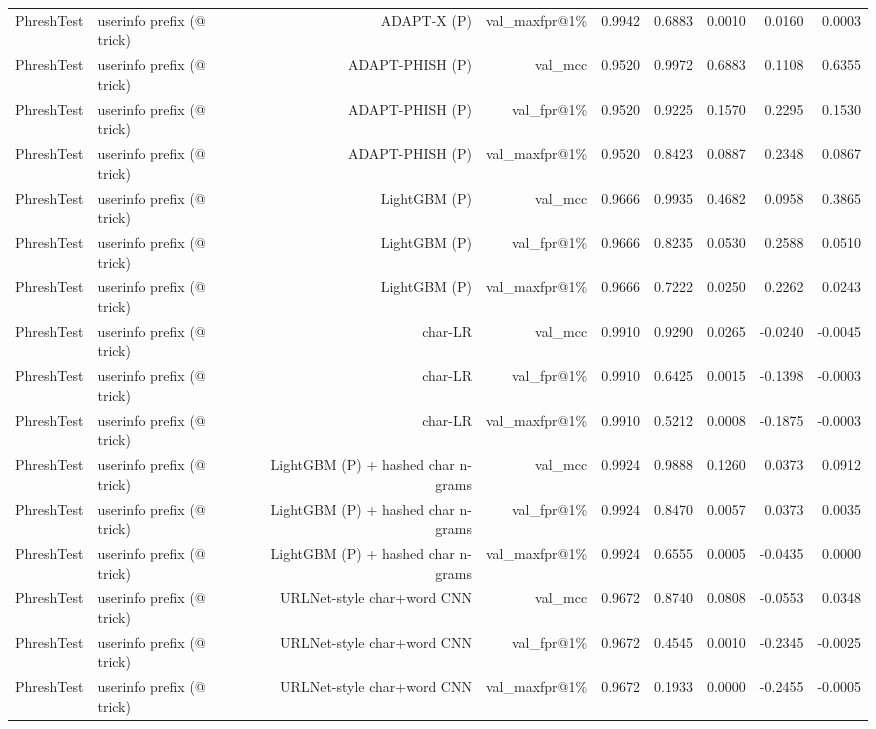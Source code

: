 \begin{table}[t]
\begin{tabular}{llrrrrrrr}
PhreshTest & userinfo prefix (@ trick) & ADAPT-X (P) & val\_maxfpr@1\% & 0.9942 & 0.6883 & 0.0010 & 0.0160 & 0.0003 \\
PhreshTest & userinfo prefix (@ trick) & ADAPT-PHISH (P) & val\_mcc & 0.9520 & 0.9972 & 0.6883 & 0.1108 & 0.6355 \\
PhreshTest & userinfo prefix (@ trick) & ADAPT-PHISH (P) & val\_fpr@1\% & 0.9520 & 0.9225 & 0.1570 & 0.2295 & 0.1530 \\
PhreshTest & userinfo prefix (@ trick) & ADAPT-PHISH (P) & val\_maxfpr@1\% & 0.9520 & 0.8423 & 0.0887 & 0.2348 & 0.0867 \\
PhreshTest & userinfo prefix (@ trick) & LightGBM (P) & val\_mcc & 0.9666 & 0.9935 & 0.4682 & 0.0958 & 0.3865 \\
PhreshTest & userinfo prefix (@ trick) & LightGBM (P) & val\_fpr@1\% & 0.9666 & 0.8235 & 0.0530 & 0.2588 & 0.0510 \\
PhreshTest & userinfo prefix (@ trick) & LightGBM (P) & val\_maxfpr@1\% & 0.9666 & 0.7222 & 0.0250 & 0.2262 & 0.0243 \\
PhreshTest & userinfo prefix (@ trick) & char-LR & val\_mcc & 0.9910 & 0.9290 & 0.0265 & -0.0240 & -0.0045 \\
PhreshTest & userinfo prefix (@ trick) & char-LR & val\_fpr@1\% & 0.9910 & 0.6425 & 0.0015 & -0.1398 & -0.0003 \\
PhreshTest & userinfo prefix (@ trick) & char-LR & val\_maxfpr@1\% & 0.9910 & 0.5212 & 0.0008 & -0.1875 & -0.0003 \\
PhreshTest & userinfo prefix (@ trick) & LightGBM (P) + hashed char n-grams & val\_mcc & 0.9924 & 0.9888 & 0.1260 & 0.0373 & 0.0912 \\
PhreshTest & userinfo prefix (@ trick) & LightGBM (P) + hashed char n-grams & val\_fpr@1\% & 0.9924 & 0.8470 & 0.0057 & 0.0373 & 0.0035 \\
PhreshTest & userinfo prefix (@ trick) & LightGBM (P) + hashed char n-grams & val\_maxfpr@1\% & 0.9924 & 0.6555 & 0.0005 & -0.0435 & 0.0000 \\
PhreshTest & userinfo prefix (@ trick) & URLNet-style char+word CNN & val\_mcc & 0.9672 & 0.8740 & 0.0808 & -0.0553 & 0.0348 \\
PhreshTest & userinfo prefix (@ trick) & URLNet-style char+word CNN & val\_fpr@1\% & 0.9672 & 0.4545 & 0.0010 & -0.2345 & -0.0025 \\
PhreshTest & userinfo prefix (@ trick) & URLNet-style char+word CNN & val\_maxfpr@1\% & 0.9672 & 0.1933 & 0.0000 & -0.2455 & -0.0005 \\

\end{tabular}
\end{table}
